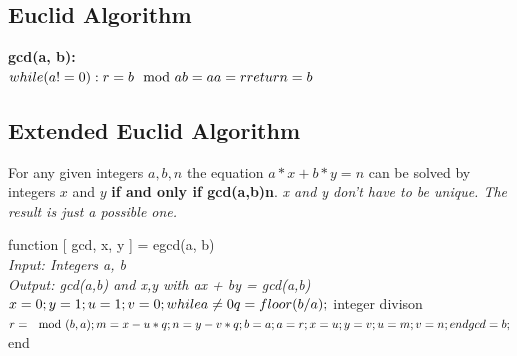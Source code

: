 \hypertarget{euclid-algorithm}{%
\subsection{Euclid Algorithm}\label{euclid-algorithm}}

\begin{tcolorbox}[colback=red!5!white,colframe=red!75!black]
\bf{gcd(a, b):} \\
$while (a!=0): \\ 
  r = b \mod a \\
  b = a  \\
  a = r \\
return = b$ 
\end{tcolorbox}

\hypertarget{extended-euclid-algorithm}{%
\subsection{Extended Euclid Algorithm}\label{extended-euclid-algorithm}}

For any given integers $a, b, n$ the equation \textbf{$a*x + b*y = n$} can be solved by integers $x$ and $y$ \textbf{if and only if gcd(a,b)\textbar{}n}. \emph{x and y don't have to be unique. The result is just a possible one.}

\begin{tcolorbox}[colback=red!5!white,colframe=red!75!black]
function [ gcd, x, y ] = egcd(a, b)\\
\textit{Input: Integers a, b} \\
\textit{Output: gcd(a,b) and x,y with ax + by = gcd(a,b)} \\
$x = 0; \\
y = 1; \\
u = 1; \\
v = 0; \\
while a \neq 0 \\
    q = floor(b/a);$ integer divison  \\
    $r = \mod(b,a); \\
    m = x - u*q; \\
    n = y - v*q; \\
    b = a; \\
    a = r; \\
    x = u; \\
    y = v; \\
    u = m; \\
    v = n; \\
end \\
gcd = b;$ \\
end
\end{tcolorbox}

